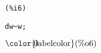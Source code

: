 \noindent
\begin{minipage}[t]{8ex}
\color{red}\bf
\begin{verbatim}
(%i6) 
\end{verbatim}
\end{minipage}
\begin{minipage}[t]{\textwidth}
\color{blue}
\begin{verbatim}
dw~w;
\end{verbatim}
\end{minipage}
\begin{math}\displaystyle
\parbox{8ex}{\color{labelcolor}(\%o6) }
0
\end{math}
